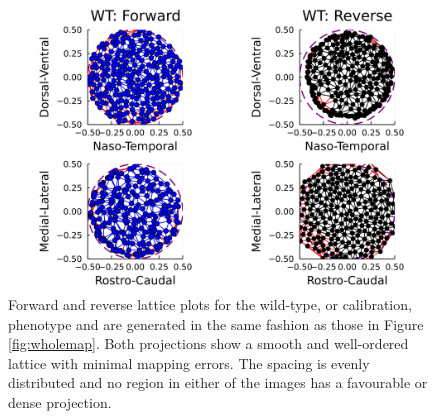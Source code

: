 \begin{figure}[hbt!]
	\centering
	\includegraphics[width=\textwidth]{images/distributed_kernels/figure_lattice_WT}
	\caption{\label{fig:wtlattice} Forward and reverse lattice plots for the wild-type, or calibration, phenotype and are generated in the same fashion as those in Figure \ref{fig:wholemap}. Both projections show a smooth and well-ordered lattice with minimal mapping errors. The spacing is evenly distributed and no region in either of the images has a favourable or dense projection.}
\end{figure}
\newpage
